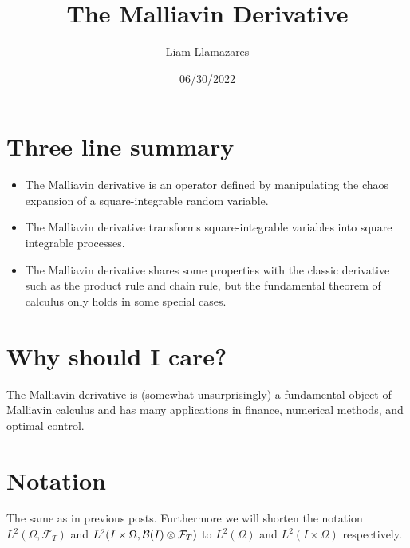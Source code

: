 \documentclass[12pt]{article}
\begin{document}
\title{The Malliavin Derivative}
\author{Liam Llamazares}
\date{06/30/2022}
\maketitle
\section{ Three line summary}
\begin{itemize}
	\item The Malliavin derivative is an operator defined by manipulating the chaos expansion of a square-integrable random variable.
	\item The Malliavin derivative transforms square-integrable variables into square integrable processes.
	\item The Malliavin derivative shares some properties with the classic derivative such as the product rule and chain rule, but the fundamental theorem of calculus only holds in some special cases.
\end{itemize}
\section{Why should I care?}
The Malliavin derivative is  (somewhat unsurprisingly) a fundamental object of Malliavin calculus and has many applications in finance, numerical methods, and optimal control.
\section{Notation}
The same as in previous posts. Furthermore we will shorten the notation  $L^2(\Omega,\mathcal{F}_T)$ and $L^2(I\times\Omega,\mathcal{B}(I)\otimes \mathcal{F}_T)$ to $L^2(\Omega)$ and $L^2(I\times\Omega)$ respectively.
\end{document}
